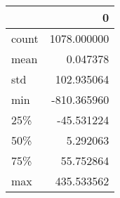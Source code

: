 \begin{tabular}{lr}
\toprule
{} &            0 \\
\midrule
count &  1078.000000 \\
mean  &     0.047378 \\
std   &   102.935064 \\
min   &  -810.365960 \\
25\%   &   -45.531224 \\
50\%   &     5.292063 \\
75\%   &    55.752864 \\
max   &   435.533562 \\
\bottomrule
\end{tabular}
